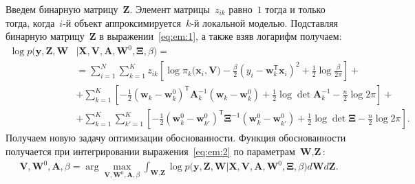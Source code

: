 Введем бинарную матрицу~$\mathbf{Z}$. Элемент матрицы~$z_{ik}$ равно~$1$ тогда и только тогда, когда~$i$-й объект аппроксимируется~$k$-й локальной моделью.
Подставляя бинарную матрицу~$\mathbf{Z}$ в выражении~\eqref{eq:em:1}, а также взяв логарифм получаем:
\[
\label{eq:em:2}
\begin{aligned}
\log p\bigr(\mathbf{y}, \mathbf{Z}, \mathbf{W}&|\mathbf{X}, \mathbf{V}, \textbf{A}, \textbf{W}^{0},  \bm{\Xi}, \beta\bigr) =\\
&= \sum_{i=1}^{N}\sum_{k=1}^{K}z_{ik}\left[\log\pi_k\bigr(\textbf{x}_i, \textbf{V}\bigr) - \frac{\beta}{2}\left(y_{i} - \textbf{w}_{k}^{\mathsf{T}}\textbf{x}_{i}\right)^{2} + \frac{1}{2}\log\frac{\beta}{2\pi}\right] +\\
&+ \sum_{k=1}^{K}\left[-\frac{1}{2}\left(\textbf{w}_{k} - \textbf{w}_{k}^{0}\right)^{\mathsf{T}}\textbf{A}_{k}^{-1}\left(\textbf{w}_{k} - \textbf{w}_{k}^{0}\right) + \frac{1}{2}\log\det\textbf{A}^{-1}_{k} - \frac{n}{2}\log2\pi\right]+\\
&+ \sum_{k=1}^{K}\sum_{k'=1}^{K}\left[-\frac{1}{2}\left(\textbf{w}_{k}^{0}-\textbf{w}_{k'}^{0}\right)^{\mathsf{T}}\bm{\Xi}^{-1}\left(\textbf{w}_{k}^{0}-\textbf{w}_{k'}^{0}\right) +\frac{1}{2}\log\det \bm{\Xi} -\frac{n}{2}\log{2\pi}\right].
\end{aligned}
\]
Получаем новую задачу оптимизации обоснованности. Функция обоснованности получается при интегрировании выражения~\eqref{eq:em:2} по параметрам~$\textbf{W}, \textbf{Z}$:
\[
\label{eq:em:3}
\begin{aligned}
\mathbf{V}, \mathbf{W}^0, \textbf{A},  \beta = \arg\max_{\mathbf{V}, \mathbf{W}^0, \textbf{A}, \beta} \int_{\textbf{W}, \textbf{Z}}\log p\bigr(\mathbf{y}, \textbf{Z}, \textbf{W}|\mathbf{X}, \mathbf{V}, \textbf{A}, \textbf{W}^{0}, \bm{\Xi}, \beta\bigr)d\textbf{W}d\textbf{Z}.
\end{aligned}
\]

